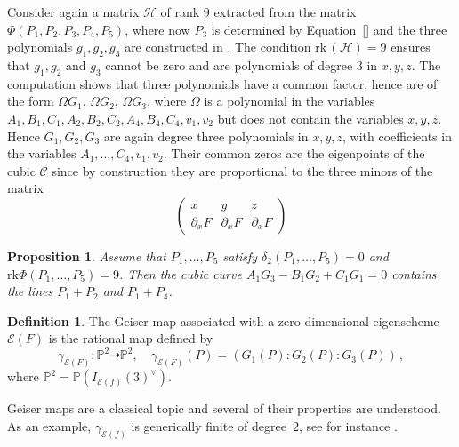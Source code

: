 \documentclass{amsart}
\theoremstyle{plain}
\newtheorem{prop}[lemma]{Proposition}
\theoremstyle{definition}
\newtheorem{definition}[lemma]{Definition}
\newcommand{\p}{\mathbb{P}}
\newcommand{\Eig}[1]{\mathcal{E}\!\left( {#1} \right)}
\newcommand{\cbc}{\ensuremath{\mathcal{C}}}
\newcommand{\rk}{\ensuremath{\mathrm{rk}}}
\begin{document}
Consider again a matrix $\mathcal{H}$ of rank $9$ extracted from
the matrix $\Phi(P_1, P_2, P_3, P_4, P_5)$, where now $P_3$ is determined by Equation~\eqref{}
and the three polynomials $g_1, g_2, g_3$ are constructed
in . The condition
$\rk \,(\mathcal{H}) = 9$ ensures that
$g_1, g_2$ and $g_3$ cannot be zero and are polynomials of degree
$3$ in $x, y, z$.
The computation shows that three polynomials have a common factor,
hence are of the form $\Omega G_1$, $\Omega G_2$, $\Omega G_3$, where
$\Omega$ is a polynomial in the variables
$A_1, B_1, C_1, A_2, B_2, C_2, A_4, B_4, C_4, v_1, v_2$ but
does not contain the variables $x, y, z$.
Hence $G_1, G_2, G_3$ are again
degree three polynomials in $x, y, z$, with coefficients in the variables
$A_1, \dots, C_4, v_1, v_2$. Their common zeros are the eigenpoints of the
cubic $\cbc$ since by construction they are proportional to the three minors of the matrix
%
\[
 \left(
 \begin{array}{ccc}
  x & y & z \\
  \partial_x F & \partial_x F & \partial_x F
 \end{array}
 \right)
\]
%

\begin{prop}
\label{proposition:G_split}
 Assume that $P_1, \dots, P_5 $ satisfy $\delta_2(P_1, \dotsc, P_5) = 0$ and $\rk \Phi(P_1, \dotsc, P_5) = 9$. Then the cubic curve $A_1 G_3 - B_1 G_2 + C_1 G_1=0$ contains the lines $P_1 +P_2$ and $P_1 +P_4$.

\end{prop}
\begin{definition}
%
The Geiser map associated with a zero dimensional eigenscheme $\Eig{F}$ is the rational map defined by
%
\[
\gamma_{\Eig{F}} \colon \p ^2 \dasharrow \p^2, \quad
\gamma_{\Eig{F}} (P) = (G_1(P):G_2(P):G_3(P)) \,,
\]
%
where $\p^2 = \p(I_{\Eig{f}}(3)^{\vee})$.
\end{definition}

Geiser maps are a classical topic and several of their properties are understood. As an example, $\gamma_{\Eig{f}}$ is generically finite of degree~$2$, see for instance \cite[Section~8.7.2]{Dolgachev}.
\end{document}
